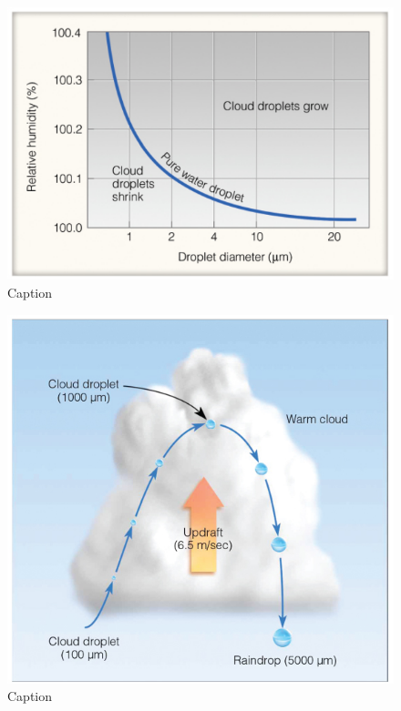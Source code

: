 \documentclass[12pt,oneside]{book}
\begin{document}
\begin{figure}

{\centering \includegraphics[width=0.9\linewidth]{figures/Figure325} 

}

\caption{Caption}\label{fig:clouddroplet2}
\end{figure}

\begin{figure}

{\centering \includegraphics[width=0.9\linewidth]{figures/Figure326} 

}

\caption{Caption}\label{fig:clouddroplet3}
\end{figure}
\end{document}
